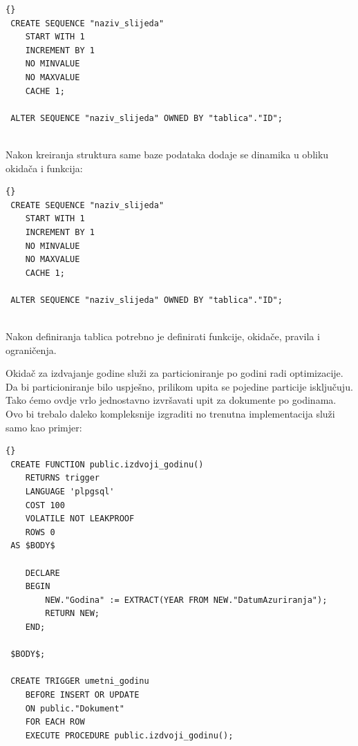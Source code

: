 \documentclass[a4paper,12pt]{foi}
\begin{document}
\lstset{commentstyle=\textit,language=SQL}
\begin{lstlisting}[frame=tb]{}
 CREATE SEQUENCE "naziv_slijeda"
    START WITH 1
    INCREMENT BY 1
    NO MINVALUE
    NO MAXVALUE
    CACHE 1;
    
 ALTER SEQUENCE "naziv_slijeda" OWNED BY "tablica"."ID";
 
\end{lstlisting}

Nakon kreiranja struktura same baze podataka dodaje se dinamika u obliku okidača i funkcija: 

\lstset{commentstyle=\textit,language=SQL}
\begin{lstlisting}[frame=tb]{}
 CREATE SEQUENCE "naziv_slijeda"
    START WITH 1
    INCREMENT BY 1
    NO MINVALUE
    NO MAXVALUE
    CACHE 1;
    
 ALTER SEQUENCE "naziv_slijeda" OWNED BY "tablica"."ID";
 
\end{lstlisting}

Nakon definiranja tablica potrebno je definirati funkcije, okidače, pravila i ograničenja.

Okidač za izdvajanje godine služi za particioniranje po godini radi optimizacije. Da bi particioniranje bilo uspješno, prilikom upita se pojedine particije isključuju. Tako ćemo ovdje vrlo jednostavno izvršavati upit za dokumente po godinama. Ovo bi trebalo daleko kompleksnije izgraditi no trenutna implementacija služi samo kao primjer: 


\lstset{commentstyle=\textit,language=SQL}
\begin{lstlisting}[frame=tb]{}
 CREATE FUNCTION public.izdvoji_godinu()
    RETURNS trigger
    LANGUAGE 'plpgsql'
    COST 100
    VOLATILE NOT LEAKPROOF 
    ROWS 0
 AS $BODY$
 
    DECLARE 
    BEGIN 
        NEW."Godina" := EXTRACT(YEAR FROM NEW."DatumAzuriranja");
        RETURN NEW;
    END; 
    
 $BODY$;

 CREATE TRIGGER umetni_godinu
    BEFORE INSERT OR UPDATE 
    ON public."Dokument"
    FOR EACH ROW
    EXECUTE PROCEDURE public.izdvoji_godinu();

\end{lstlisting} 
\end{document}
